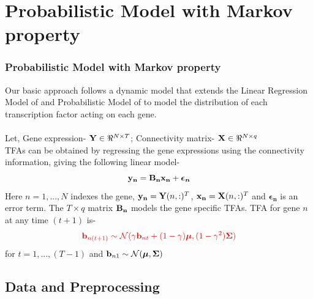 \documentclass{beamer}
\begin{document}
\section{Probabilistic Model with Markov property}
\begin{frame}
\frametitle{Probabilistic Model with Markov property}
Our basic approach follows a dynamic model that extends the 
{\color{green} Linear Regression Model} of  \cite{p1}  and 
{\color{blue} Probabilistic Model} of  \cite{p2} to model the distribution of each transcription factor acting on each gene.\\~\\

Let, Gene expression- $ \bold{Y} \in \Re^{N \times T} $;  
Connectivity matrix- $ \bold{X} \in \Re^{N \times q} $ \\
TFAs can be obtained by regressing the gene expressions using the connectivity information, giving the following linear model-
\begin{equation}
\bold{y_{n}} = \bold{B_{n}} \bold{x_{n}} + \boldsymbol{\epsilon_{n}}
\end{equation}
Here $n = 1, . . . ,N$ indexes the gene, $ \bold{y_{n}} = \bold{Y}(n,:)^T $, $ \bold{x_{n}} = \bold{X}(n,:)^T $ and  $ \boldsymbol{\epsilon_{n}} $ is an error term. The ${T \times q}$ matrix $ \bold{B_{n}} $ models the gene specific TFAs. TFA for gene $n$ at any time $(t+1)$ is-
\begin{equation}
\color{red}\bold{b}_{n(t+1)} \sim \mathcal{N} (\gamma\bold{b}_{nt} + (1-\gamma)\boldsymbol{\mu},(1-\gamma^2)\boldsymbol{\Sigma}) 
\end{equation}
for $ t= 1, ... , (T-1)$ and $ \bold{b}_{n1} \sim \mathcal{N} ( \boldsymbol{\mu},\boldsymbol{\Sigma})$
\end{frame}


\subsection{Data and Preprocessing}
\end{document}
